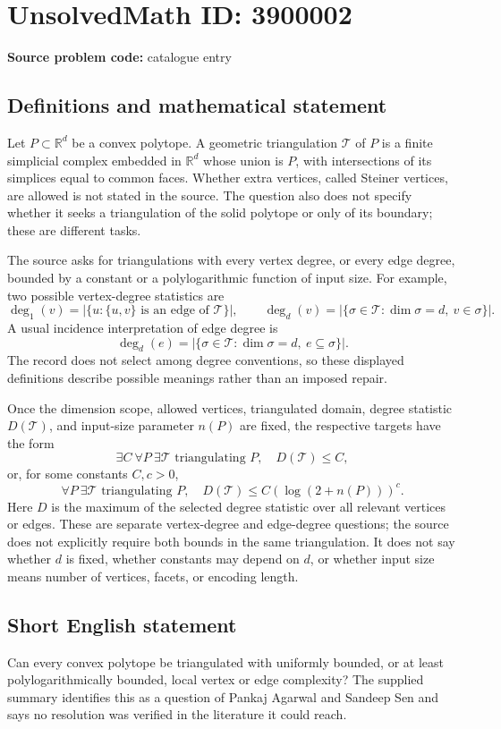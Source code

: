 \documentclass[11pt]{article}
\newcommand{\R}{\mathbb{R}}
\begin{document}
\section*{UnsolvedMath ID: 3900002}
\textbf{Source problem code:} catalogue entry
\subsection{Definitions and mathematical statement}
Let $P\subset\R^d$ be a convex polytope. A geometric triangulation $\mathcal T$ of $P$ is a finite simplicial complex embedded in $\R^d$ whose union is $P$, with intersections of its simplices equal to common faces. Whether extra vertices, called Steiner vertices, are allowed is not stated in the source. The question also does not specify whether it seeks a triangulation of the solid polytope or only of its boundary; these are different tasks.

The source asks for triangulations with every vertex degree, or every edge degree, bounded by a constant or a polylogarithmic function of input size. For example, two possible vertex-degree statistics are
\[
 \deg_1(v)=|\{u:\{u,v\}\text{ is an edge of }\mathcal T\}|,
 \qquad
 \deg_d(v)=|\{\sigma\in\mathcal T:\dim\sigma=d,\ v\in\sigma\}|.
\]
A usual incidence interpretation of edge degree is
\[
 \deg_d(e)=|\{\sigma\in\mathcal T:\dim\sigma=d,\ e\subseteq\sigma\}|.
\]
The record does not select among degree conventions, so these displayed definitions describe possible meanings rather than an imposed repair.

Once the dimension scope, allowed vertices, triangulated domain, degree statistic $D(\mathcal T)$, and input-size parameter $n(P)$ are fixed, the respective targets have the form
\[
 \exists C\ \forall P\ \exists\mathcal T\text{ triangulating }P,
       \quad D(\mathcal T)\le C,
\]
or, for some constants $C,c>0$,
\[
 \forall P\ \exists\mathcal T\text{ triangulating }P,
       \quad D(\mathcal T)\le C(\log(2+n(P)))^c.
\]
Here $D$ is the maximum of the selected degree statistic over all relevant vertices or edges. These are separate vertex-degree and edge-degree questions; the source does not explicitly require both bounds in the same triangulation. It does not say whether $d$ is fixed, whether constants may depend on $d$, or whether input size means number of vertices, facets, or encoding length.
\subsection{Short English statement}
Can every convex polytope be triangulated with uniformly bounded, or at least polylogarithmically bounded, local vertex or edge complexity? The supplied summary identifies this as a question of Pankaj Agarwal and Sandeep Sen and says no resolution was verified in the literature it could reach.
\end{document}
